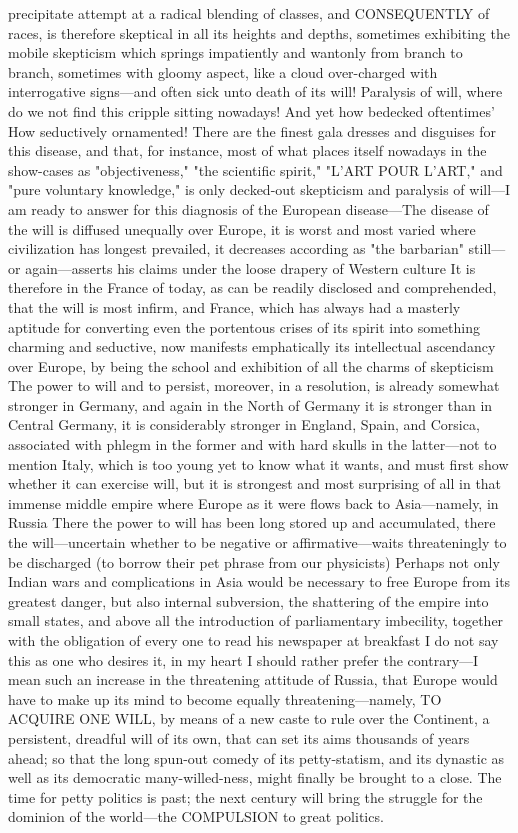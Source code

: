 \documentclass[12pt]{article}
\begin{document}
precipitate attempt at a radical blending of classes, and CONSEQUENTLY of races, is therefore skeptical in all its heights and depths, sometimes exhibiting the mobile skepticism which springs impatiently and wantonly from branch to branch, sometimes with gloomy aspect, like a cloud over-charged with interrogative signs---and often sick unto death of its will! Paralysis of will, where do we not find this cripple sitting nowadays! And yet how bedecked oftentimes' How seductively ornamented! There are the finest gala dresses and disguises for this disease, and that, for instance, most of what places itself nowadays in the show-cases as "objectiveness," "the scientific spirit," "L'ART POUR L'ART," and "pure voluntary knowledge," is only decked-out skepticism and paralysis of will---I am ready to answer for this diagnosis of the European disease---The disease of the will is diffused unequally over Europe, it is worst and most varied where civilization has longest prevailed, it decreases according as "the barbarian" still---or again---asserts his claims under the loose drapery of Western culture It is therefore in the France of today, as can be readily disclosed and comprehended, that the will is most infirm, and France, which has always had a masterly aptitude for converting even the portentous crises of its spirit into something charming and seductive, now manifests emphatically its intellectual ascendancy over Europe, by being the school and exhibition of all the charms of skepticism The power to will and to persist, moreover, in a resolution, is already somewhat stronger in Germany, and again in the North of Germany it is stronger than in Central Germany, it is considerably stronger in England, Spain, and Corsica, associated with phlegm in the former and with hard skulls in the latter---not to mention Italy, which is too young yet to know what it wants, and must first show whether it can exercise will, but it is strongest and most surprising of all in that immense middle empire where Europe as it were flows back to Asia---namely, in Russia There the power to will has been long stored up and accumulated, there the will---uncertain whether to be negative or affirmative---waits threateningly to be discharged (to borrow their pet phrase from our physicists) Perhaps not only Indian wars and complications in Asia would be necessary to free Europe from its greatest danger, but also internal subversion, the shattering of the empire into small states, and above all the introduction of parliamentary imbecility, together with the obligation of every one to read his newspaper at breakfast I do not say this as one who desires it, in my heart I should rather prefer the contrary---I mean such an increase in the threatening attitude of Russia, that Europe would have to make up its mind to become equally threatening---namely, TO ACQUIRE ONE WILL, by means of a new caste to rule over the Continent, a persistent, dreadful will of its own, that can set its aims thousands of years ahead; so that the long spun-out comedy of its petty-statism, and its dynastic as well as its democratic many-willed-ness, might finally be brought to a close. The time for petty politics is past; the next century will bring the struggle for the dominion of the world---the COMPULSION to great politics.
\end{document}
